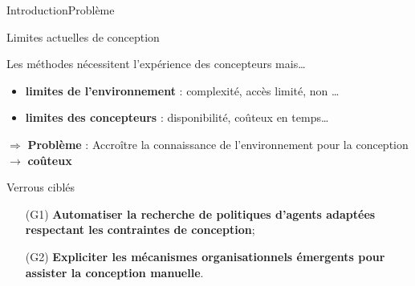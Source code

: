 \begin{frame}{Introduction}{Problème}


    \begin{alertblock}{Limites actuelles de conception}

        Les méthodes nécessitent l'expérience des concepteurs mais\dots
        \begin{itemize}
            \item \textbf{limites de l'environnement} : complexité, accès limité, non \dots
            \item \textbf{limites des concepteurs} : disponibilité, coûteux en temps\dots
        \end{itemize}

        \vspace{-2ex}

        \begin{center}
            \begin{minipage}{13.5cm}
                \begin{block}{}
                    $\Longrightarrow$ \textbf{Problème} : Accroître la connaissance de l'environnement pour la conception $\rightarrow$ \textbf{coûteux}
                \end{block}
            \end{minipage}
        \end{center}

    \end{alertblock}

    \begin{exampleblock}{Verrous ciblés}
        \begin{enumerate}
            \item[\phantom{X} (G1)] \textbf{Automatiser la recherche de politiques d'agents adaptées respectant les contraintes de conception};
            \item[\phantom{X} (G2)] \textbf{Expliciter les mécanismes organisationnels émergents pour assister la conception manuelle}.
        \end{enumerate}
    \end{exampleblock}

\end{frame}

